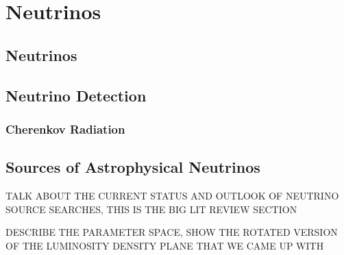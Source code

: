 \chapter{Neutrinos}
\label{sec:neutrinos}



\section{Neutrinos}
\label{sec:intro:multimessenger}



\section{Neutrino Detection}
\label{sec:intro:gammarays}



\subsection{Cherenkov Radiation}
\label{sec:intro:cosmicrays}


\section{Sources of Astrophysical Neutrinos}
\label{sec:sources_overview}

TALK ABOUT THE CURRENT STATUS AND OUTLOOK OF NEUTRINO SOURCE SEARCHES, THIS IS THE BIG LIT REVIEW SECTION

DESCRIBE THE PARAMETER SPACE, SHOW THE ROTATED VERSION OF THE LUMINOSITY DENSITY PLANE THAT WE CAME UP WITH
